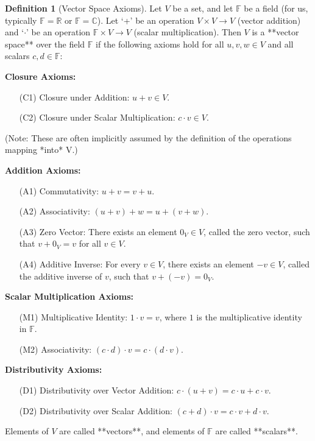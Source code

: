 \documentclass[11pt]{article}
\theoremstyle{definition}
\newtheorem{definition}[theorem]{Definition}
\theoremstyle{remark}
\newcommand{\R}{\mathbb{R}}
\newcommand{\C}{\mathbb{C}}
\newcommand{\F}{\mathbb{F}} %
\begin{document}
\begin{definition}[Vector Space Axioms]
Let $V$ be a set, and let $\F$ be a field (for us, typically $\F = \R$ or $\F = \C$). Let `+' be an operation $V \times V \to V$ (vector addition) and `$\cdot$' be an operation $\F \times V \to V$ (scalar multiplication). Then $V$ is a **vector space** over the field $\F$ if the following axioms hold for all $u, v, w \in V$ and all scalars $c, d \in \F$:

\medskip\noindent\textbf{Closure Axioms:}
\begin{enumerate}
    \item[(C1)] Closure under Addition: $u + v \in V$.
    \item[(C2)] Closure under Scalar Multiplication: $c \cdot v \in V$.
\end{enumerate}
(Note: These are often implicitly assumed by the definition of the operations mapping *into* V.)

\medskip\noindent\textbf{Addition Axioms:}
\begin{enumerate}
    \item[(A1)] Commutativity: $u + v = v + u$.
    \item[(A2)] Associativity: $(u + v) + w = u + (v + w)$.
    \item[(A3)] Zero Vector: There exists an element $0_V \in V$, called the zero vector, such that $v + 0_V = v$ for all $v \in V$.
    \item[(A4)] Additive Inverse: For every $v \in V$, there exists an element $-v \in V$, called the additive inverse of $v$, such that $v + (-v) = 0_V$.
\end{enumerate}

\medskip\noindent\textbf{Scalar Multiplication Axioms:}
\begin{enumerate}
    \item[(M1)] Multiplicative Identity: $1 \cdot v = v$, where $1$ is the multiplicative identity in $\F$.
    \item[(M2)] Associativity: $(c \cdot d) \cdot v = c \cdot (d \cdot v)$.
\end{enumerate}

\medskip\noindent\textbf{Distributivity Axioms:}
\begin{enumerate}
    \item[(D1)] Distributivity over Vector Addition: $c \cdot (u + v) = c \cdot u + c \cdot v$.
    \item[(D2)] Distributivity over Scalar Addition: $(c + d) \cdot v = c \cdot v + d \cdot v$.
\end{enumerate}
Elements of $V$ are called **vectors**, and elements of $\F$ are called **scalars**.
\end{definition}
\end{document}

